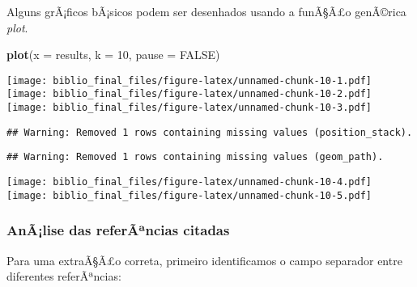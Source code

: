 \documentclass[]{article}
\newenvironment{Shaded}{\begin{snugshade}}{\end{snugshade}}
\newcommand{\KeywordTok}[1]{\textcolor[rgb]{0.13,0.29,0.53}{\textbf{#1}}}
\newcommand{\DataTypeTok}[1]{\textcolor[rgb]{0.13,0.29,0.53}{#1}}
\newcommand{\DecValTok}[1]{\textcolor[rgb]{0.00,0.00,0.81}{#1}}
\newcommand{\OtherTok}[1]{\textcolor[rgb]{0.56,0.35,0.01}{#1}}
\newcommand{\OperatorTok}[1]{\textcolor[rgb]{0.81,0.36,0.00}{\textbf{#1}}}
\newcommand{\NormalTok}[1]{#1}
\begin{document}
Alguns grÃ¡ficos bÃ¡sicos podem ser desenhados usando a funÃ§Ã£o
genÃ©rica \emph{plot}.

\begin{Shaded}
\begin{Highlighting}[]
\KeywordTok{plot}\NormalTok{(}\DataTypeTok{x =}\NormalTok{ results, }\DataTypeTok{k =} \DecValTok{10}\NormalTok{, }\DataTypeTok{pause =} \OtherTok{FALSE}\NormalTok{)}
\end{Highlighting}
\end{Shaded}

\texttt{[image: biblio\_final\_files/figure-latex/unnamed-chunk-10-1.pdf]}
\texttt{[image: biblio\_final\_files/figure-latex/unnamed-chunk-10-2.pdf]}
\texttt{[image: biblio\_final\_files/figure-latex/unnamed-chunk-10-3.pdf]}

\begin{verbatim}
## Warning: Removed 1 rows containing missing values (position_stack).
\end{verbatim}

\begin{verbatim}
## Warning: Removed 1 rows containing missing values (geom_path).
\end{verbatim}

\texttt{[image: biblio\_final\_files/figure-latex/unnamed-chunk-10-4.pdf]}
\texttt{[image: biblio\_final\_files/figure-latex/unnamed-chunk-10-5.pdf]}

\subsubsection{AnÃ¡lise das referÃªncias
citadas}\label{analise-das-referancias-citadas}

Para uma extraÃ§Ã£o correta, primeiro identificamos o campo separador
entre diferentes referÃªncias:

\begin{Shaded}
\end{Shaded}
\end{document}
